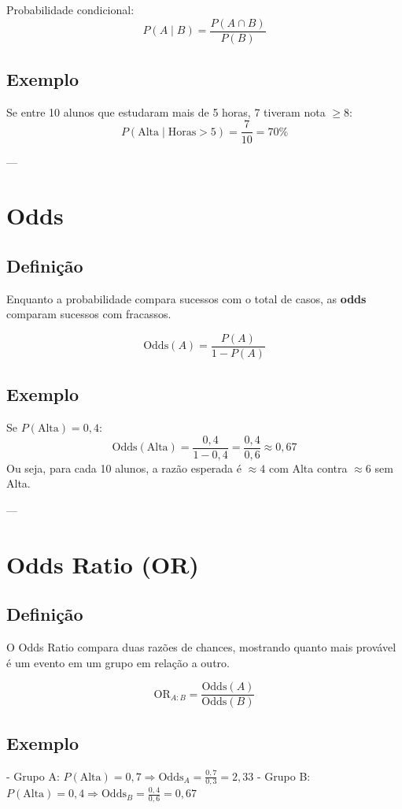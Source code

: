 \begin{FormulaBox}
Probabilidade condicional:
\[
P(A \mid B) = \frac{P(A \cap B)}{P(B)}
\]
\end{FormulaBox}

\subsection*{Exemplo}
Se entre 10 alunos que estudaram mais de 5 horas, 7 tiveram nota $\ge 8$:  
\[
P(\text{Alta} \mid \text{Horas}>5) = \frac{7}{10} = 70\%
\]

---

\section{Odds}
\subsection*{Definição}
Enquanto a probabilidade compara sucessos com o total de casos, as \textbf{odds} comparam sucessos com fracassos.

\begin{FormulaBox}
\[
\mathrm{Odds}(A) = \frac{P(A)}{1-P(A)}
\]
\end{FormulaBox}

\subsection*{Exemplo}
Se $P(\text{Alta})=0,4$:  
\[
\mathrm{Odds}(\text{Alta}) = \frac{0,4}{1-0,4} = \frac{0,4}{0,6} \approx 0,67
\]  
Ou seja, para cada 10 alunos, a razão esperada é $\approx 4$ com Alta contra $\approx 6$ sem Alta.

---

\section{Odds Ratio (OR)}
\subsection*{Definição}
O Odds Ratio compara duas razões de chances, mostrando quanto mais provável é um evento em um grupo em relação a outro.

\begin{FormulaBox}
\[
\mathrm{OR}_{A:B} = \frac{\mathrm{Odds}(A)}{\mathrm{Odds}(B)}
\]
\end{FormulaBox}

\subsection*{Exemplo}
- Grupo A: $P(\text{Alta})=0,7 \Rightarrow \mathrm{Odds}_A=\tfrac{0,7}{0,3}=2,33$  
- Grupo B: $P(\text{Alta})=0,4 \Rightarrow \mathrm{Odds}_B=\tfrac{0,4}{0,6}=0,67$  

